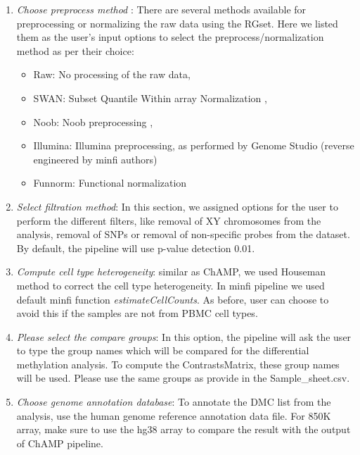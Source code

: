 \documentclass[
  a4paper,
  oneside,
  open=any]{scrreport}
\providecommand{\tightlist}{%
  \setlength{\itemsep}{0pt}\setlength{\parskip}{0pt}}\usepackage{longtable,booktabs,array}
\begin{document}
\begin{enumerate}
\def\labelenumi{\arabic{enumi}.}
\item
  \emph{Choose preprocess method} : There are several methods available
  for preprocessing or normalizing the raw data using the RGset. Here we
  listed them as the user's input options to select the
  preprocess/normalization method as per their choice:

  \begin{itemize}
  \tightlist
  \item
    Raw: No processing of the raw data,
  \item
    SWAN: Subset Quantile Within array Normalization
    \autocite{maksimovic2012swan,touleimat2012complete},
  \item
    Noob: Noob preprocessing \autocite{triche2013low},
  \item
    Illumina: Illumina preprocessing, as performed by Genome Studio
    (reverse engineered by minfi authors) \autocite{aryee2014minfi}
  \item
    Funnorm: Functional normalization \autocite{fortin2014functional}
  \end{itemize}
\item
  \emph{Select filtration method}: In this section, we assigned options
  for the user to perform the different filters, like removal of XY
  chromosomes from the analysis, removal of SNPs or removal of
  non-specific probes from the dataset. By default, the pipeline will
  use p-value detection 0.01.
\item
  \emph{Compute cell type heterogeneity}: similar as ChAMP, we used
  Houseman method to correct the cell type heterogeneity. In minfi
  pipeline we used default minfi function \emph{estimateCellCounts}. As
  before, user can choose to avoid this if the samples are not from PBMC
  cell types.
\item
  \emph{Please select the compare groups}: In this option, the pipeline
  will ask the user to type the group names which will be compared for
  the differential methylation analysis. To compute the ContrastsMatrix,
  these group names will be used. Please use the same groups as provide
  in the Sample\_sheet.csv.
\item
  \emph{Choose genome annotation database}: To annotate the DMC list
  from the analysis, use the human genome reference annotation data
  file. For 850K array, make sure to use the hg38 array to compare the
  result with the output of ChAMP pipeline.\\
\end{enumerate}
\end{document}
